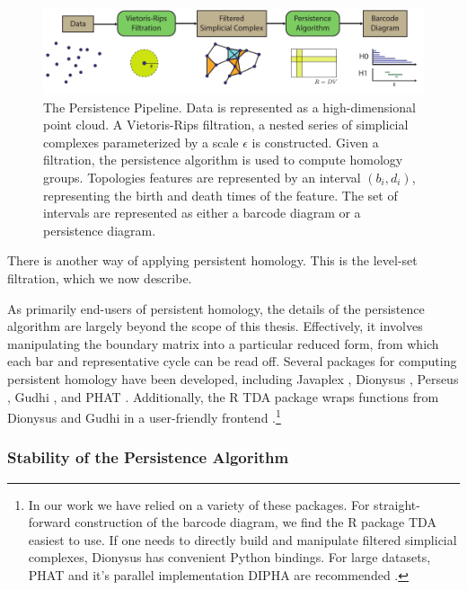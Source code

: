 \begin{figure}[t]
	\centering
	\includegraphics[]{./fig/background/persistence_pipeline.pdf}
	\caption[The Persistence Pipeline]{The Persistence Pipeline. Data is represented as a high-dimensional point cloud. A Vietoris-Rips filtration, a nested series of simplicial complexes parameterized by a scale $\epsilon$ is constructed. Given a filtration, the persistence algorithm is used to compute homology groups. Topologies features are represented by an interval $(b_i, d_i)$, representing the birth and death times of the feature. The set of intervals are represented as either a barcode diagram or a persistence diagram.}
	\label{fig:bg:persistence_pipeline}
\end{figure}

There is another way of applying persistent homology.
This is the level-set filtration, which we now describe.

As primarily end-users of persistent homology, the details of the persistence algorithm are largely beyond the scope of this thesis.
Effectively, it involves manipulating the boundary matrix into a particular reduced form, from which each bar and representative cycle can be read off.
Several packages for computing persistent homology have been developed, including Javaplex \cite{Tausz:2011}, Dionysus \cite{Morozov:2012}, Perseus \cite{Nanda:2013}, Gudhi \cite{maria:hal-01108461}, and PHAT \cite{Bauer:PHAT:2015}.
Additionally, the R TDA package wraps functions from Dionysus and Gudhi in a user-friendly frontend \cite{Fasy:TDA:2015}.\footnote{In our work we have relied on a variety of these packages. For straight-forward construction of the barcode diagram, we find the R package TDA easiest to use. If one needs to directly build and manipulate filtered simplicial complexes, Dionysus has convenient Python bindings. For large datasets, PHAT and it's parallel implementation DIPHA are recommended \cite{Bauer:DIPHA:2015,Bauer:2014gd}.}

\subsubsection{Stability of the Persistence Algorithm}
\label{bg:tda:ph:stability}

